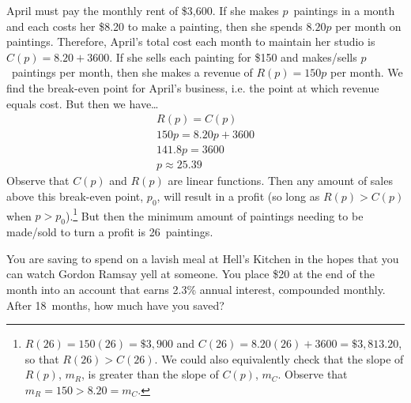 \documentclass[12pt,letterpaper]{exam}
\begin{document}
\begin{questions}
\sol April must pay the monthly rent of \$3,600. If she makes $p$~paintings in a month and each costs her \$8.20 to make a painting, then she spends $8.20p$ per month on paintings. Therefore, April's total cost each month to maintain her studio is $C(p)= 8.20 + 3600$. If she sells each painting for \$150 and makes/sells $p$~paintings per month, then she makes a revenue of $R(p)= 150p$ per month. We find the break-even point for April's business, i.e. the point at which revenue equals cost. But then we have\dots
	\[
	\begin{gathered}
	R(p)= C(p) \\
	150p= 8.20p + 3600 \\
	141.8p= 3600 \\
	p \approx 25.39
	\end{gathered}
	\]
Observe that $C(p)$ and $R(p)$ are linear functions. Then any amount of sales above this break-even point, $p_0$, will result in a profit (so long as $R(p) > C(p)$ when $p > p_0$).\footnote{$R(26)= 150(26)= \$3,\!900$ and $C(26)= 8.20(26) + 3600= \$3,\!813.20$, so that $R(26) > C(26)$. We could also equivalently check that the slope of $R(p)$, $m_R$, is greater than the slope of $C(p)$, $m_C$. Observe that $m_R= 150 > 8.20= m_C$.} But then the minimum amount of paintings needing to be made/sold to turn a profit is 26~paintings. 



\newpage
\question[10] You are saving to spend on a lavish meal at Hell's Kitchen in the hopes that you can watch Gordon Ramsay yell at someone. You place \$20 at the end of the month into an account that earns 2.3\% annual interest, compounded monthly. After 18~months, how much have you saved? \pspace


\end{questions}
\end{document}
